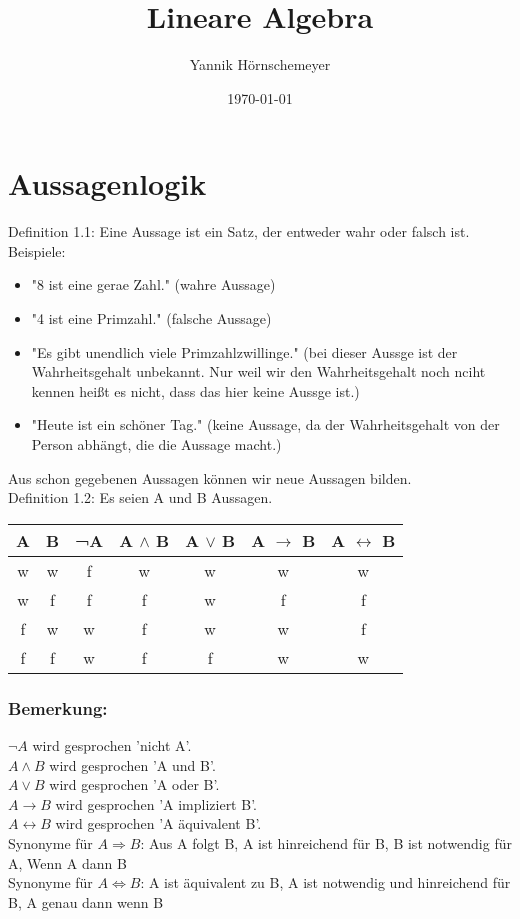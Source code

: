 \documentclass{article}
\title{Lineare Algebra}
\author{Yannik Hörnschemeyer}
\date{\today}
\begin{document}
\maketitle

\section{Aussagenlogik}
Definition 1.1: Eine Aussage ist ein Satz, der entweder wahr oder falsch ist.\\
Beispiele:
\begin{itemize}
    \item "8 ist eine gerae Zahl." (wahre Aussage)
    \item "4 ist eine Primzahl." (falsche Aussage)
    \item "Es gibt unendlich viele Primzahlzwillinge." (bei dieser Aussge ist der Wahrheitsgehalt unbekannt. Nur weil wir den Wahrheitsgehalt noch nciht kennen heißt es nicht, dass das hier keine Aussge ist.)
    \item "Heute ist ein schöner Tag." (keine Aussage, da der Wahrheitsgehalt von der Person abhängt, die die Aussage macht.)
\end{itemize}

Aus schon gegebenen Aussagen können wir neue Aussagen bilden.\\
Definition 1.2: Es seien A und B Aussagen. 

\begin{center}
    \begin{tabular}{|c|c|c|c|c|c|c|}
        \hline
        A & B & ¬A & A $\wedge$ B & A $\vee$ B & A $\rightarrow$ B & A $\leftrightarrow$ B \\
        \hline
        \hline
        w & w & f & w & w & w & w \\
        w & f & f & f & w & f & f \\
        f & w & w & f & w & w & f \\
        f & f & w & f & f & w & w \\
        \hline
    \end{tabular}
\end{center}

\subsubsection*{Bemerkung:}
$\neg A$ wird gesprochen 'nicht A'. \\
$A \wedge B$ wird gesprochen 'A und B'. \\
$A \vee B$ wird gesprochen 'A oder B'. \\
$A \rightarrow B$ wird gesprochen 'A impliziert B'. \\
$A \leftrightarrow B$ wird gesprochen 'A äquivalent B'. \\
Synonyme für $A \Rightarrow B$: Aus A folgt B, A ist hinreichend für B, B ist notwendig für A, Wenn A dann B \\
Synonyme für $A \Leftrightarrow B$: A ist äquivalent zu B, A ist notwendig und hinreichend für B, A genau dann wenn B \\
\end{document}
